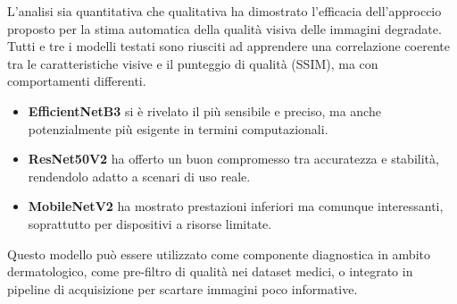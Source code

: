 L’analisi sia quantitativa che qualitativa ha dimostrato l’efficacia dell’approccio proposto per la stima automatica della qualità visiva delle immagini degradate. Tutti e tre i modelli testati sono riusciti ad apprendere una correlazione coerente tra le caratteristiche visive e il punteggio di qualità (SSIM), ma con comportamenti differenti.

\begin{itemize}
    \item \textbf{EfficientNetB3} si è rivelato il più sensibile e preciso, ma anche potenzialmente più esigente in termini computazionali.
    \item \textbf{ResNet50V2} ha offerto un buon compromesso tra accuratezza e stabilità, rendendolo adatto a scenari di uso reale.
    \item \textbf{MobileNetV2} ha mostrato prestazioni inferiori ma comunque interessanti, soprattutto per dispositivi a risorse limitate.
\end{itemize}

Questo modello può essere utilizzato come componente diagnostica in ambito dermatologico, come pre-filtro di qualità nei dataset medici, o integrato in pipeline di acquisizione per scartare immagini poco informative.

